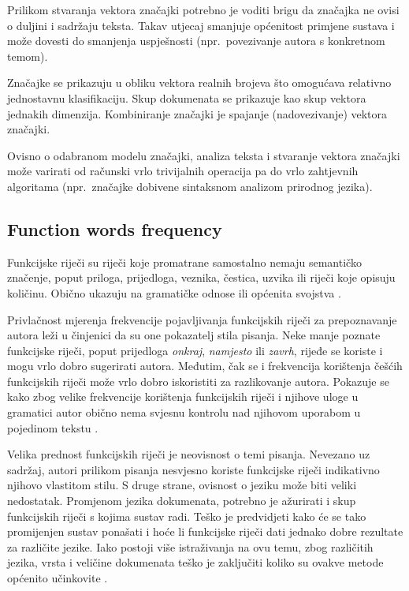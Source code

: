 \documentclass[11pt,english]{article}
\begin{document}
\begin{multicols}{2}
Prilikom stvaranja vektora značajki potrebno je voditi brigu da značajka ne
ovisi o duljini i sadržaju teksta. Takav utjecaj smanjuje općenitost primjene
sustava i može dovesti do smanjenja uspješnosti (npr.~povezivanje autora s
konkretnom temom).

Značajke se prikazuju u obliku vektora realnih brojeva što omogućava relativno
jednostavnu klasifikaciju. Skup dokumenata se prikazuje kao skup vektora jednakih
dimenzija. Kombiniranje značajki je spajanje (nadovezivanje) vektora značajki.


Ovisno o odabranom modelu značajki, analiza teksta i stvaranje vektora značajki
može varirati od računski vrlo trivijalnih operacija pa do vrlo zahtjevnih
algoritama (npr.~značajke dobivene sintaksnom analizom prirodnog jezika).


\subsection{Function words frequency}
\label{sec:funkcijske-rijeci}
Funkcijske riječi su riječi koje promatrane samostalno nemaju semantičko
značenje, poput priloga, prijedloga, veznika, čestica, uzvika ili riječi koje
opisuju količinu. Obično ukazuju na gramatičke odnose ili općenita svojstva
\citep{zhao2005effective}.

Privlačnost mjerenja frekvencije pojavljivanja funkcijskih riječi za
prepoznavanje autora leži u činjenici da su one pokazatelj stila pisanja. Neke
manje poznate funkcijske riječi, poput prijedloga \emph{onkraj},
\emph{namjesto} ili \emph{zavrh}, rijeđe se koriste i mogu vrlo dobro
sugerirati autora. Međutim, čak se i frekvencija korištenja češćih funkcijskih
riječi može vrlo dobro iskoristiti za razlikovanje autora. Pokazuje se kako zbog
velike frekvencije korištenja funkcijskih riječi i njihove uloge u gramatici
autor obično nema svjesnu kontrolu nad njihovom uporabom u pojedinom tekstu
\citep{argamon2005measuring}.

Velika prednost funkcijskih riječi je neovisnost o temi pisanja. Nevezano uz
sadržaj, autori prilikom pisanja nesvjesno koriste funkcijske riječi indikativno
njihovo vlastitom stilu. S druge strane, ovisnost o jeziku može biti veliki
nedostatak. Promjenom jezika dokumenata, potrebno je ažurirati i skup funkcijskih
riječi s kojima sustav radi. Teško je predvidjeti kako će se tako promijenjen
sustav ponašati i hoće li funkcijske riječi dati jednako dobre rezultate za
različite jezike. Iako postoji više istraživanja na ovu temu, zbog različitih
jezika, vrsta i veličine dokumenata teško je zaključiti koliko su ovakve metode
općenito učinkovite \citep{zhao2005effective}.


\end{multicols}
\end{document}
